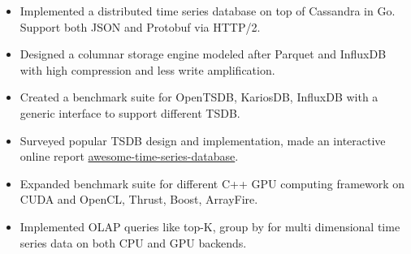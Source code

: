 \documentclass[11pt, letterpaper]{simple-cv}
\begin{document}
\begin{itemize}
	\item Implemented a distributed time series database on top of Cassandra in Go. Support both JSON and Protobuf via HTTP/2.
	\item Designed a columnar storage engine modeled after Parquet and InfluxDB with high compression and less write amplification.
	\item Created a benchmark suite for OpenTSDB, KariosDB, InfluxDB with a generic interface to support different TSDB.
	\item Surveyed popular TSDB design and implementation, made an interactive online report \href{https://xephonhq.github.io/awesome-time-series-database}{awesome-time-series-database}.
\end{itemize}


\begin{itemize}
	\item Expanded benchmark suite for different C++ GPU computing framework on CUDA and OpenCL, Thrust, Boost, ArrayFire.
	\item Implemented OLAP queries like top-K, group by for multi dimensional time series data on both CPU and GPU backends.
\end{itemize}




\end{document}
